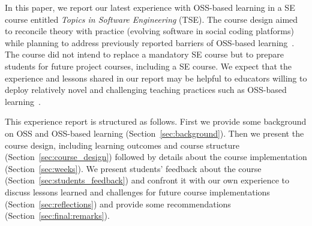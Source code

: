 \documentclass[sigconf]{acmart}
\begin{document}
\begin{comment}
\citet{DBLP:conf/sbes/BritoSCNB18} surveyed the literature for studies on the use of OSS projects in SEE and found that 69\% of the primary studies published between 2014 and 2018 were \textit{experience reports}.
We performed an \textit{ad-hoc} literature review and searched explicitly for \textit{experience reports published between 2019 and 2022}. \citet{dorodchi2019teaching} reported 
an undergraduate course for SE with emphasis on open source,
teamwork, and modeling. The results
reveal that students are satisfied with the course model for
teamwork, however, not as much satisfied with the open source
activities which is in-line with literature due to the challenges
of open source on installation, configuration, and running on
different hardware with different operating systems.
Their observations and initial findings indicated that students enjoyed the open source challenges and demonstrated professional competency after the course, with a positive impact of open source and teamwork on students.
\citet{ryan:icse:seet:2022} reported their experience on a course in which students should learn how to read the code of an existing, large-scale OS system to become contributing members of its community.
\end{comment}

In this paper, we report our latest experience with OSS-based learning in a SE course entitled \textit{Topics in Software Engineering} (TSE). %
The course design aimed to reconcile theory with practice (evolving software in social coding platforms) while planning to address previously reported barriers of OSS-based learning~\cite{nascimento:fie:2018, nascimento:oss:2019, pinto:cseet:2017, DBLP:conf/sbes/FerreiraS0SM18, DBLP:conf/icse/0001FSSM19}.  
The course did not intend to replace a mandatory SE course but to prepare students for future project courses, including a SE course.
We expect that the experience and lessons shared in our report may be helpful to educators willing to deploy relatively novel and challenging teaching practices such as OSS-based learning~\cite{Silva:Santos:Flach:2023}.
  
This experience report is structured as follows. 
First we provide some background on OSS and OSS-based learning (Section~\ref{sec:background}). Then 
we present the course design, including learning outcomes and course structure (Section~\ref{sec:course_design}) followed by details about the course implementation (Section~\ref{sec:weeks}).
We present students' feedback about the course (Section~\ref{sec:students_feedback}) and confront it with our own experience to discuss lessons learned and challenges for future course implementations (Section~\ref{sec:reflections}) and provide some recommendations (Section~\ref{sec:final:remarks}).
\end{document}
